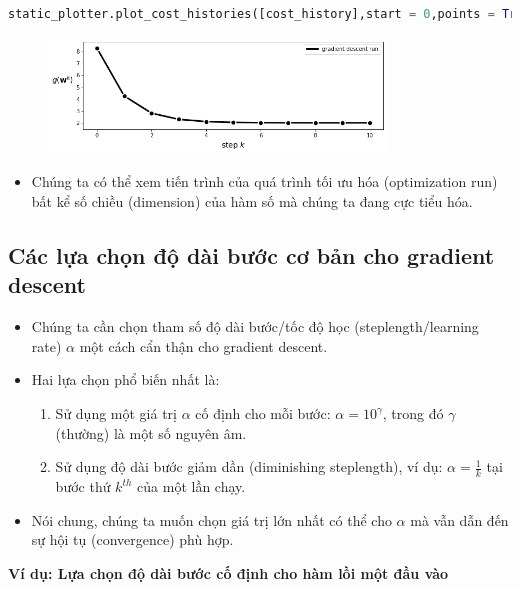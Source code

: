 \documentclass{book}
\begin{document}
\begin{lstlisting}[language=python]
    static_plotter.plot_cost_histories([cost_history],start = 0,points = True,labels = ['gradient descent run'])
\end{lstlisting}
\begin{figure}[H]
    \centering
    \includegraphics[width=0.8\textwidth]{images/a_convex_multi-input_example_his.png}
\end{figure}
\begin{itemize}
    \item Chúng ta có thể xem tiến trình của quá trình tối ưu hóa (optimization run) bất kể số chiều (dimension) của hàm số mà chúng ta đang cực tiểu hóa.
\end{itemize}

\subsection{Các lựa chọn độ dài bước cơ bản cho gradient descent}
\begin{itemize}
    \item Chúng ta cần chọn tham số độ dài bước/tốc độ học (steplength/learning rate) $\alpha$ một cách cẩn thận cho gradient descent.
    \item Hai lựa chọn phổ biến nhất là:
    \begin{enumerate}
        \item Sử dụng một giá trị $\alpha$ cố định cho mỗi bước: $\alpha=10^{\gamma}$, trong đó $\gamma$ (thường) là một số nguyên âm.
        \item Sử dụng độ dài bước giảm dần (diminishing steplength), ví dụ: $\alpha=\frac{1}{k}$ tại bước thứ $k^{th}$ của một lần chạy.
    \end{enumerate}
    \item Nói chung, chúng ta muốn chọn giá trị lớn nhất có thể cho $\alpha$ mà vẫn dẫn đến sự hội tụ (convergence) phù hợp.
\end{itemize}

\textbf{Ví dụ: Lựa chọn độ dài bước cố định cho hàm lồi một đầu vào}
\end{document}
